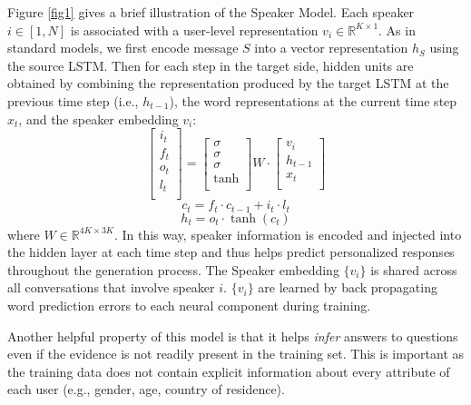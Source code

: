 Figure \ref{fig1} gives a brief illustration of the Speaker Model. 
Each speaker $i\in [1,N]$ is associated with a user-level representation $v_i\in\mathbb{R}^{K\times 1}$. 
 As in standard \sts models, we first encode message  $S$ into a vector representation $h_S$ using the source LSTM. 
Then for each step in the target side, hidden units are obtained by 
combining the representation produced by the target LSTM at the previous time step (i.e., $h_{t-1}$), the word representations at the current time step $x_t$, and the speaker embedding $v_i$:
\begin{equation}
\left[
\begin{array}{lr}
i_t\\
f_t\\
o_t\\
l_t\\
\end{array}
\right]=
\left[
\begin{array}{c}
\sigma\\
\sigma\\
\sigma\\
\tanh\\
\end{array}
\right]
W\cdot
\left[
\begin{array}{c}
v_i\\
h_{t-1}\\
x_t\\
\end{array}
\right]
\end{equation}
\begin{equation}
c_t=f_t\cdot c_{t-1}+i_t\cdot l_t
\end{equation}
\begin{equation}
h_{t}=o_t\cdot \tanh(c_t)
\end{equation}
where $W\in \mathbb{R}^{4K\times 3K}$. 
In this way, speaker information is encoded and 
injected into the hidden layer at each time step and thus helps predict personalized responses throughout the generation process.
The Speaker embedding $\{v_i\}$ is shared across all conversations that involve speaker $i$.  $\{v_i\}$ are learned by back propagating word prediction errors to each neural component during training. 

Another helpful property of this model is that it 
helps {\it infer} answers to questions even if the evidence is not readily present in the training set.
This is important as
the training data does not contain explicit 
information about every
attribute of each user
(e.g., gender, age, country of residence).

